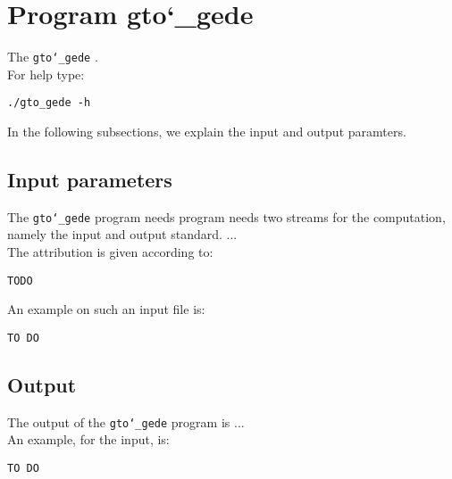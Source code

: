 \section{Program gto\char`_gede}
The \texttt{gto\char`_gede} .\\
For help type:
\begin{lstlisting}
./gto_gede -h
\end{lstlisting}
In the following subsections, we explain the input and output paramters.

\subsection*{Input parameters}

The \texttt{gto\char`_gede} program needs program needs two streams for the computation, namely the input and output standard. ...\\
The attribution is given according to:
\begin{lstlisting}
TODO
\end{lstlisting}
An example on such an input file is:
\begin{lstlisting}
TO DO
\end{lstlisting}

\subsection*{Output}
The output of the \texttt{gto\char`_gede} program is ...\\
An example, for the input, is:
\begin{lstlisting}
TO DO
\end{lstlisting}